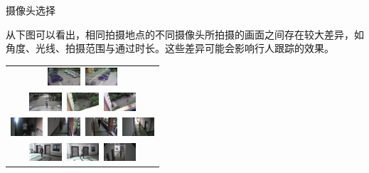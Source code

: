     \begin{frame}{摄像头选择}
    \begin{block}{}
    从下图可以看出，相同拍摄地点的不同摄像头所拍摄的画面之间存在较大差异，如角度、光线、拍摄范围与通过时长。这些差异可能会影响行人跟踪的效果。
    \end{block}
    \begin{table}
    \centering
    \begin{tabular}{c}
    \includegraphics[width=12mm]{figures/1-1}~\includegraphics[width=12mm]{figures/1-2} \\
    \includegraphics[width=12mm]{figures/1-4}~\includegraphics[width=12mm]{figures/1-5}~\includegraphics[width=12mm]{figures/1-6} \\
    \includegraphics[width=12mm]{figures/2-1}~\includegraphics[width=12mm]{figures/2-2}~\includegraphics[width=12mm]{figures/2-3}~\includegraphics[width=12mm]{figures/2-4} \\
    \includegraphics[width=12mm]{figures/3-1}~\includegraphics[width=12mm]{figures/3-2}~\includegraphics[width=12mm]{figures/3-3} \\

\end{tabular}
\end{table}
\end{frame}

